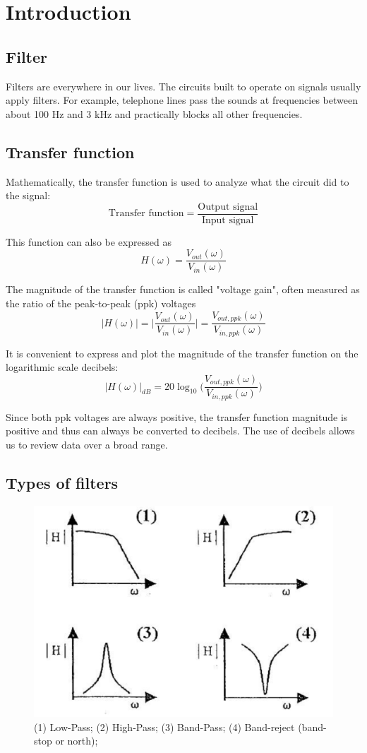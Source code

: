 \documentclass{article}
\begin{document}
\section{Introduction\label{intro}}

\subsection{Filter}
Filters are everywhere in our lives. The circuits built to operate on signals usually apply filters. For example, telephone lines pass the sounds at frequencies between about 100 Hz and 3 kHz and practically blocks all other frequencies.

\subsection{Transfer function}
Mathematically, the transfer function is used to analyze what the circuit did to the signal:
$$\text{Transfer function} = \frac{\text{Output signal}}{\text{Input signal}}$$

This function can also be expressed as
$$H(\omega) = \frac{V_{out}(\omega)}{V_{in}(\omega)}$$

The magnitude of the transfer function is called "voltage gain", often measured as the ratio of the peak-to-peak (ppk) voltages
$$|H(\omega)|=\bigg|\frac{V_{out}(\omega)}{V_{in}(\omega)}\bigg| = \frac{V_{out,ppk}(\omega)}{V_{in,ppk}(\omega)}$$

It is convenient to express and plot the magnitude of the transfer function on the logarithmic scale decibels:
$$|H(\omega)|_{dB} = 20\log_{10}\bigg(\frac{V_{out,ppk}(\omega)}{V_{in,ppk}(\omega)}\bigg)$$

Since both ppk voltages are always positive, the transfer function magnitude is positive and thus can always be converted to decibels. The use of decibels allows us to review data over a broad range.

\subsection{Types of filters}
\begin{figure}[H]\centering
    \includegraphics[scale=0.6]{type.png}
    \caption{(1) Low-Pass; (2) High-Pass; (3) Band-Pass; (4) Band-reject (band-stop or north);}
\end{figure}
\end{document}
